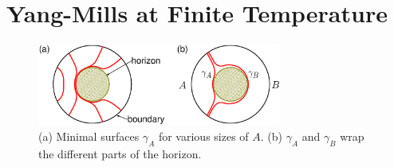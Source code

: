 \documentclass[amsmath,amssymb,nofootinbib,eqsecnum,tighten,prd,12pt]{revtex4}
\begin{document}
\section{Yang-Mills at Finite Temperature}


\begin{figure}
\begin{center}
\includegraphics[width=8cm,clip]{ads_blackhole.eps}
\end{center}
\caption{ \label{fig: ads_blackhole.eps} (a) Minimal surfaces
$\gamma_A$ for various sizes of $A$. (b) $\gamma_A$ and $\gamma_B$
wrap the different parts of the horizon.}
\end{figure}
\end{document}

